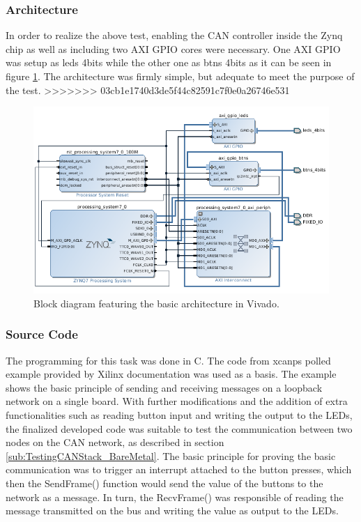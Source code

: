 \subsubsection{Architecture}
In order to realize the above test, enabling the CAN controller inside the Zynq chip as well as including two AXI GPIO cores were necessary.
One AXI GPIO was setup as leds 4bits while the other one as btns 4bits as it can be seen in figure \ref{fig:CAN_Testing_Architecture}. The architecture was firmly simple, but adequate to meet the purpose of the test.
>>>>>>> 03cb1e1740d3de5f44c82591c7f0e0a26746e531

\begin{figure}[h!]
	\centering
	\includegraphics[width = 1.1\linewidth]{graphics/Zybo_BasicTestingArchitecture_for_CAN.png}
	\caption{Block diagram featuring the basic architecture in Vivado.}
	\label{fig:CAN_Testing_Architecture}
\end{figure}

\subsubsection{Source Code}
The programming for this task was done in C.
The code from xcanps polled example provided by Xilinx documentation was used as a basis.
The example shows the basic principle of sending and receiving messages on a loopback network on a single board.
With further modifications and the addition of extra functionalities such as reading button input and writing the output to the LEDs, the finalized developed code was suitable to test the communication between two nodes on the CAN network, as described in section \ref{sub:TestingCANStack_BareMetal}.
The basic principle for proving the basic communication was to trigger an interrupt attached to the button presses, which then the SendFrame() function would send the value of the buttons to the network as a message.
In turn, the RecvFrame() was responsible of reading the message transmitted on the bus and writing the value as output to the LEDs.

